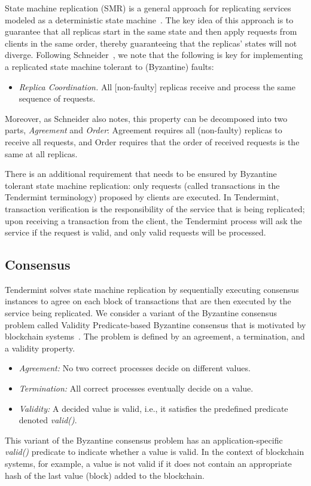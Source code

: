 State machine replication (SMR) is a general approach for replicating services
modeled as a deterministic state machine~\cite{Lam78:cacm,Sch90:survey}.  The
key idea of this approach is to guarantee that all replicas start in the same
state and then apply requests from clients in the same order, thereby
guaranteeing that the replicas' states will not diverge.  Following
Schneider~\cite{Sch90:survey}, we note that the following is key for
implementing a replicated state machine tolerant to (Byzantine) faults:

\begin{itemize} \item \emph{Replica Coordination.} All [non-faulty] replicas
    receive and process the same sequence of requests.  \end{itemize}

Moreover, as Schneider also notes, this property can be decomposed into two
parts, \emph{Agreement} and \emph{Order}: Agreement requires all (non-faulty)
replicas to receive all requests, and Order requires that the order of received
requests is the same at all replicas.

There is an additional requirement that needs to be ensured by Byzantine
tolerant state machine replication: only requests (called transactions in the
Tendermint terminology) proposed by clients are executed. In Tendermint,
transaction verification is the responsibility of the service that is being
replicated; upon receiving a transaction from the client, the Tendermint
process will ask the service if the request is valid, and only valid requests
will be processed. 

 \subsection{Consensus} \label{sec:consensus}

Tendermint solves state machine replication by sequentially executing consensus
instances to agree on each block of transactions that are
then executed by the service being replicated. We consider a variant of the
Byzantine consensus problem called Validity Predicate-based Byzantine consensus
that is motivated by blockchain systems~\cite{GLR17:red-belly-bc}. The problem
is defined by an agreement, a termination, and a validity property.

 \begin{itemize} \item \emph{Agreement:} No two correct processes decide on
         different values.  \item \emph{Termination:} All correct processes
         eventually decide on a value.  \item \emph{Validity:} A decided value
             is valid, i.e., it satisfies the predefined predicate denoted
             \emph{valid()}.  \end{itemize}

 This variant of the Byzantine consensus problem has an application-specific
 \emph{valid()} predicate to indicate whether a value is valid. In the context
 of blockchain systems, for example, a value is not valid if it does not
 contain an appropriate hash of the last value (block) added to the blockchain.
